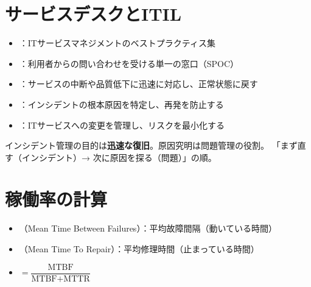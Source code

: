 \section{サービスデスクとITIL}

\begin{teigi}[ITILとサービスデスク]
\begin{itemize}
  \item {}：ITサービスマネジメントのベストプラクティス集
  \item {}：利用者からの問い合わせを受ける単一の窓口（SPOC）
  \item {}：サービスの中断や品質低下に迅速に対応し、正常状態に戻す
  \item {}：インシデントの根本原因を特定し、再発を防止する
  \item {}：ITサービスへの変更を管理し、リスクを最小化する
\end{itemize}
\end{teigi}

\begin{hikaku}[インシデント管理と問題管理]
\end{hikaku}

\begin{pitfall}
インシデント管理の目的は\textbf{迅速な復旧}。原因究明は問題管理の役割。
「まず直す（インシデント）→ 次に原因を探る（問題）」の順。
\end{pitfall}

\section{稼働率の計算}

\begin{teigi}
\begin{itemize}
  \item {}（Mean Time Between Failures）：平均故障間隔（動いている時間）
  \item {}（Mean Time To Repair）：平均修理時間（止まっている時間）
  \item {} $= \dfrac{\text{MTBF}}{\text{MTBF} + \text{MTTR}}$
\end{itemize}
\end{teigi}

